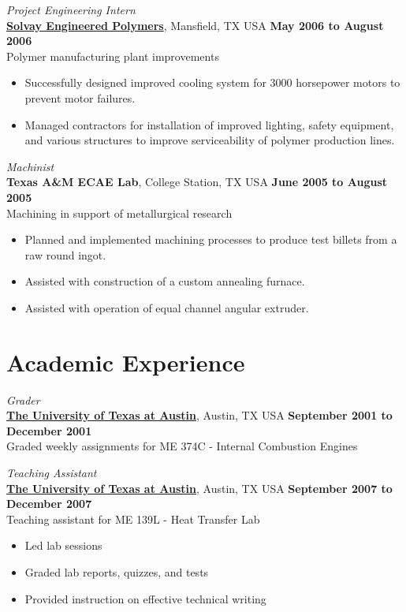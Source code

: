 \documentclass[centered]{res}
\begin{document}
\begin{resume}
%
\textit{Project Engineering Intern} \\
\href{http://www.lyondellbasell.com/LandingPages/SolvayEngineeredPolymers}{\textbf{Solvay
    Engineered Polymers}}, Mansfield, TX USA 
\hfill \textbf{May 2006 to August 2006} \\
Polymer manufacturing plant improvements 
\begin{itemize} \itemsep -2pt %
\item Successfully designed improved cooling system for 3000
  horsepower motors to prevent motor failures.
\item Managed contractors for installation of improved lighting,
  safety equipment, and various structures to improve serviceability
  of polymer production lines.
\end{itemize} 
%
\textit{Machinist} \\
\textbf{Texas A\&M ECAE Lab}, College Station, TX USA
\hfill \textbf{June 2005 to August 2005} \\
Machining in support of metallurgical research 
\begin{itemize} \itemsep -2pt %
\item Planned and implemented machining processes to produce test
  billets from a raw round ingot.
\item Assisted with construction of a custom annealing furnace.
\item Assisted with operation of equal channel angular extruder.
\end{itemize}   

\section{Academic Experience}
\label{sec:teaching}

\textit{Grader} \\
\href{http://www.utexas.edu/}{\textbf{The University of Texas at
    Austin}}, Austin, TX USA
\hfill \textbf{September 2001 to December 2001} \\
Graded weekly assignments for ME 374C - Internal Combustion Engines 

\textit{Teaching Assistant} \\
\href{http://www.utexas.edu/}{\textbf{The University of Texas at
    Austin}}, Austin, TX USA
\hfill \textbf{September 2007 to December 2007} \\
Teaching assistant for ME 139L - Heat Transfer Lab
\begin{itemize} \itemsep -2pt
\item Led lab sessions 
\item Graded lab reports, quizzes, and tests
\item Provided instruction on effective technical writing
\end{itemize}


\end{resume}
\end{document}

